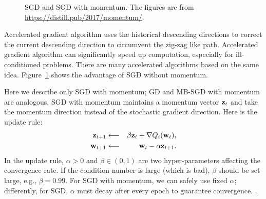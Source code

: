 \documentclass[11pt]{article}
\numberwithin{equation}{section}
\def\w{{\bf w}}
\def\z{{\bf z}}
\begin{document}
\begin{figure}[!h]
	\centering
	\caption{SGD and SGD with momentum. 
		The figures are from \url{https://distill.pub/2017/momentum/}.}
	\label{fig:sgd}
\end{figure}


Accelerated gradient algorithm uses the historical descending directions to correct the current descending direction to circumvent the zig-zag like path.
Accelerated gradient algorithm can significantly speed up computation, especially for ill-conditioned problems.
There are many accelerated algorithms based on the same idea.
Figure~\ref{fig:sgd} shows the advantage of SGD without momentum.


Here we describe only SGD with momentum; GD and MB-SGD with momentum are analogous.
SGD with momentum maintains a momentum vector $\z_t$
and take the momentum direction instead of the stochastic gradient direction.
Here is the update rule:
\begin{eqnarray*}
\z_{t+1} & \longleftarrow & \beta \z_t + \nabla Q_i (\w_t ), \\
\w_{t+1} & \longleftarrow & \w_t - \alpha \z_{t+1} .
\end{eqnarray*}
In the update rule,
$\alpha > 0$ and $\beta \in (0, 1)$ are two hyper-parameters affecting the convergence rate.
If the condition number is large (which is bad), $\beta$ should be set large, e.g., $\beta = 0.99$.
For SGD with momentum, we can safely use fixed $\alpha$;
differently, for SGD, $\alpha$ must decay after every epoch to guarantee convergence.
.
\end{document}
